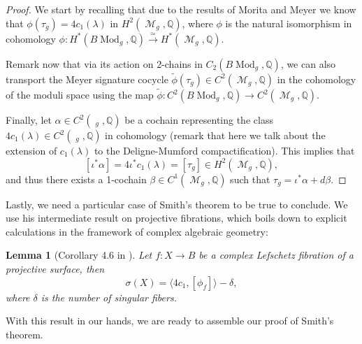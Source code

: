 \documentclass{article}
\DeclareMathOperator{\dm}{\overline{\mathcal{M}}}
\DeclareMathOperator{\m}{\mathcal{M}}
\DeclareMathOperator{\mo}{\text{Mod}}
\theoremstyle{plain}
\newtheorem{lem}{Lemma}[section]
\theoremstyle{remark}
\theoremstyle{definition}
\begin{document}
\begin{proof}
    We start by recalling that due to the results of Morita \cite{charclasses} and Meyer \cite{Meyer} we know that $\phi(\tau_g) = 4c_1(\lambda)$ in $H^2(\m_g, \mathbb{Q})$, where $\phi$ is the natural isomorphism in cohomology $\phi : H^*(B\mo_g, \mathbb{Q}) \overset{\simeq}{\to} H^*(\m_g, \mathbb{Q})$. \par 
    Remark now that via its action on 2-chains in $C_2(B\mo_g, \mathbb{Q})$, we can also transport the Meyer signature cocycle $\tilde{\phi}(\tau_g) \in C^2(\m_g, \mathbb{Q})$ in the cohomology of the moduli space using the map $\tilde{\phi} : C^2(B\mo_g, \mathbb{Q}) \to C^2(\m_g, \mathbb{Q})$. \par 
    Finally, let $\alpha \in C^2(\dm_g, \mathbb{Q})$ be a cochain representing the class $4c_1(\lambda) \in C^2(\dm_g, \mathbb{Q})$ in cohomology (remark that here we talk about the extension of $c_1(\lambda)$ to the Deligne-Mumford compactification). This implies that 
    $$[\iota^*\alpha] = 4\iota^*c_1(\lambda) =[\tau_g] \in H^2(\m_g, \mathbb{Q}), $$
    and thus there exists a 1-cochain $\beta \in C^1(\m_g, \mathbb{Q})$ such that $\tau_g = \iota^*\alpha + d\beta$.
\end{proof}
    Lastly, we need a particular case of Smith's theorem to be true to conclude. We use his intermediate result on projective fibrations, which boils down to explicit calculations in the framework of complex algebraic geometry\thinspace:
\begin{lem}[Corollary 4.6 in \cite{Smith1}] \label{SmithsProjFibr}
    Let $f:X \to B$ be a complex Lefschetz fibration of a projective surface, then $$\sigma(X) = \langle 4c_1, [\phi_f] \rangle - \delta, $$
    where $\delta$ is the number of singular fibers.
\end{lem}
    With this result in our hands, we are ready to assemble our proof of Smith's theorem.
\end{document}
